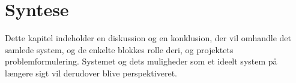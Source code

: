 \chapter{Syntese}
Dette kapitel indeholder en diskussion og en konklusion, der vil omhandle det samlede system, og de enkelte blokkes rolle deri, og projektets problemformulering. Systemet og dets muligheder som et ideelt system på længere sigt vil derudover blive perspektiveret. 